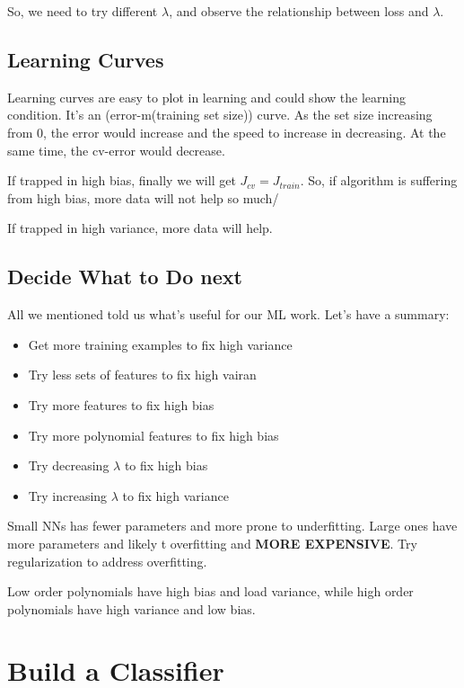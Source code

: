\documentclass[en,11pt,english,black,simple]{../elegantbook}
\begin{document}
So, we need to try different \(\lambda\), and observe the relationship between loss and \(\lambda\). 

\subsection{Learning Curves}

Learning curves are easy to plot in learning and could show the learning condition. It's an (error-m(training set size)) curve. As the set size increasing from 0, the error would increase and the speed to increase in decreasing. At the same time, the cv-error would decrease.

If trapped in high bias, finally we will get \(J_{cv} = J_{train}\). So, if algorithm is suffering from high bias, more data will not help so much/ 

If trapped in high variance, more data will help.

\subsection{Decide What to Do next}

All we mentioned told us what's useful for our ML work. Let's have a summary:

\begin{itemize}
    \item Get more training examples to fix high variance
    \item Try less sets of features to fix high vairan  
    \item Try more features to fix high bias 
    \item Try more polynomial features to fix high bias 
    \item Try decreasing \(\lambda\) to fix high bias 
    \item Try increasing \(\lambda\) to fix high variance 
\end{itemize}

Small NNs has fewer parameters and more prone to underfitting. Large ones have more parameters and likely t overfitting and \textbf{MORE EXPENSIVE}. Try regularization to address overfitting.

Low order polynomials have high bias and load variance, while high order polynomials have high variance and low bias. 


\section{Build a Classifier}
\end{document}
